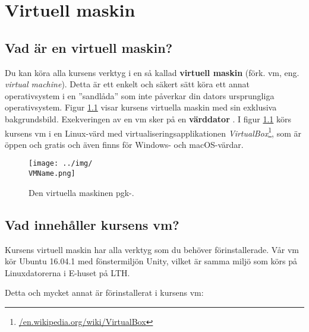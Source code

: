 
\chapter{Virtuell maskin}\label{appendix:vbox}

\section{Vad är en virtuell maskin?}

Du kan köra alla kursens verktyg i en så kallad \textbf{virtuell maskin} (förk. vm, eng. \textit{virtual machine}). 
Detta är ett enkelt och säkert sätt köra ett annat operativsystem i en ''sandlåda'' som inte påverkar din dators ursprungliga operativsystem. Figur \ref{fig:vm} visar kursens virtuella maskin med sin exklusiva bakgrundsbild. Exekveringen av en vm sker på en \textbf{värddator} . I figur \ref{fig:vm} körs kursens vm i en Linux-värd med virtualiseringsapplikationen \textit{VirtualBox}\footnote{\href{https://en.wikipedia.org/wiki/VirtualBox}{/en.wikipedia.org/wiki/VirtualBox}}, som är öppen och gratis och även finns för Windows- och macOS-värdar. 



\begin{figure}[H]
\centering
\texttt{[image: ../img/\\VMName.png]}
\caption{Den virtuella maskinen pgk-\VMName.}
\label{fig:vm}
\end{figure}


\section{Vad innehåller kursens vm?}

Kursens virtuell maskin har alla verktyg som du behöver förinstallerade.  Vår vm kör Ubuntu 16.04.1 med fönstermiljön Unity, vilket är samma miljö som körs på Linuxdatorerna i E-huset på LTH. 

Detta och mycket annat är förinstallerat i kursens vm:

